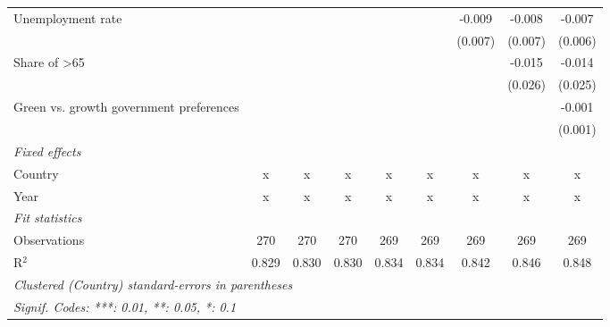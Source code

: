 \begin{table}[htbp]
\begin{tabular}{lcccccccc}
      Unemployment rate                                     &         &         &         &         &         & -0.009  & -0.008       & -0.007\\   
                                                            &         &         &         &         &         & (0.007) & (0.007)      & (0.006)\\   
      Share of >65                                          &         &         &         &         &         &         & -0.015       & -0.014\\   
                                                            &         &         &         &         &         &         & (0.026)      & (0.025)\\   
      Green vs. growth government preferences               &         &         &         &         &         &         &              & -0.001\\   
                                                            &         &         &         &         &         &         &              & (0.001)\\   
      \emph{Fixed effects}\\
      Country                                               & x       & x       & x       & x       & x       & x       & x            & x\\  
      Year                                                  & x       & x       & x       & x       & x       & x       & x            & x\\  
      \midrule \emph{Fit statistics}\\
      Observations                                          & 270     & 270     & 270     & 269     & 269     & 269     & 269          & 269\\  
      R$^2$                                                 & 0.829   & 0.830   & 0.830   & 0.834   & 0.834   & 0.842   & 0.846        & 0.848\\  
      \midrule
      \multicolumn{9}{l}{\emph{Clustered (Country) standard-errors in parentheses}}\\
      \multicolumn{9}{l}{\emph{Signif. Codes: ***: 0.01, **: 0.05, *: 0.1}}\\
   \end{tabular}
\end{table}


